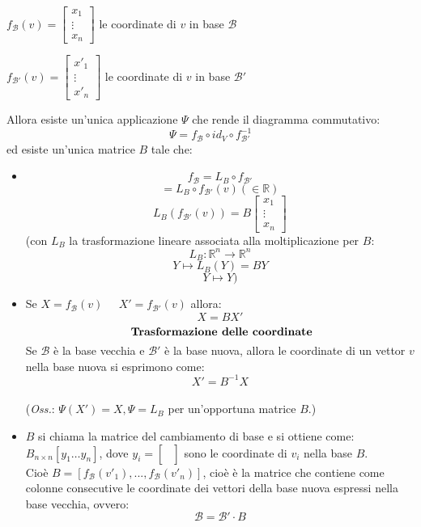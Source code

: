$f_{\mathcal{B}}(v)=\begin{bmatrix}x_1\\\vdots\\x_n\end{bmatrix}$ le coordinate di $v$ in base $\mathcal{B}$

$f_{\mathcal{B}'}(v)=\begin{bmatrix}x'_1\\\vdots\\x'_n\end{bmatrix}$ le coordinate di $v$ in base $\mathcal{B}'$

Allora esiste un'unica applicazione $\Psi$ che rende il diagramma commutativo:
\[\Psi=f_{\mathcal{B}}\circ id_V \circ f_{\mathcal{B}'}^{-1}\]
ed esiste un'unica matrice $B$ tale che:
\begin{itemize}
\item \[f_{\mathcal{B}}=L_B \circ f_{\mathcal{B}'}\]
  \[=L_B\circ f_{\mathcal{B}'}(v) (\in\mathbb{R})\]
  \[L_B(f_{\mathcal{B}'}(v))=B\begin{bmatrix}x_1\\\vdots\\x_n\end{bmatrix}\]
  (con $L_B$ la trasformazione lineare associata alla moltiplicazione per $B$:
  \[L_B: \mathbb{R}^n\rightarrow\mathbb{R}^n\]
  \[Y\mapsto L_B(Y)=BY\]
  \[Y\mapsto Y)\]

\item Se $X=f_{\mathcal{B}}(v)\;\;\;\;\;X'=f_{\mathcal{B}'}(v)$ allora:
  \[X=BX'\]\[\text{ \textbf{Trasformazione delle coordinate}}\]
  Se $\mathcal{B}$ è la base vecchia e $\mathcal{B}'$ è la base nuova, allora le coordinate di un vettor $v$ nella base nuova si esprimono come:
  \[X'=B^{-1}X\]
  \\(\textit{Oss.}: $\Psi(X')=X, \Psi=L_B$ per un'opportuna matrice $B$.)

\item $B$ si chiama la matrice del cambiamento di base e si ottiene come:
  $B_{n\times n}[y_1\dots y_n]$, dove $y_i=\begin{bmatrix}\\ \\ \\\end{bmatrix}$ sono le coordinate di $v_i$ nella base $B$.
  \\Cioè $B=[f_{\mathcal{B}}(v'_1),...,f_{\mathcal{B}}(v'_n)]$, cioè è la matrice che contiene come colonne consecutive le coordinate dei vettori della base nuova espressi nella base vecchia, ovvero:
  \[\mathcal{B}=\mathcal{B}'\cdot B\]


\end{itemize}
